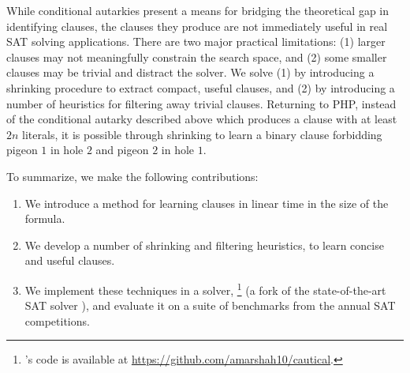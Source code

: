 While conditional autarkies present a means for bridging the theoretical gap in
identifying \pr clauses, the \pr clauses they produce are not immediately useful
in real SAT solving applications. There are two major practical limitations: (1)
larger \pr clauses may not meaningfully constrain the search space, and (2) some
smaller \pr clauses may be trivial and distract the solver. We solve (1) by
introducing a shrinking procedure to extract compact, useful \pr clauses, and
(2) by introducing a number of heuristics for filtering away trivial \pr
clauses. Returning to PHP, instead of the conditional autarky described above
which produces a clause with at least $2n$ literals, it is possible through
shrinking to learn a binary \pr clause forbidding pigeon $1$ in hole $2$ and
pigeon $2$ in hole $1$.


To summarize, we make the following contributions: 

\begin{enumerate} 
    \item We introduce a method for learning \pr clauses in linear time in the
    size of the formula. 
    \item We develop a number of shrinking and filtering heuristics, to learn
    concise and useful \pr clauses.%
    \item We implement these techniques in a solver, \tool\footnote{\tool's code
    is available at \url{https://github.com/amarshah10/cautical}.} (a fork of
    the state-of-the-art SAT solver \cadical), and evaluate it on a suite of
    benchmarks from the annual SAT competitions.
\end{enumerate}